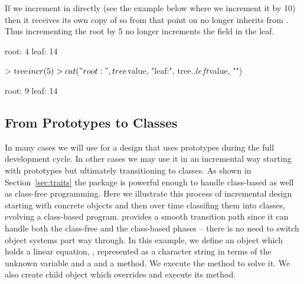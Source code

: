 \documentclass{Z}
\begin{document}
If we increment  in  directly (see the example
below where we increment it by 10) then it receives its own copy of
 so from that point on  no longer inherits
 from .  Thus incrementing the root by 5 no
longer increments the  field in the leaf.

\begin{Schunk}
\begin{Soutput}
root: 4 leaf: 14 
\end{Soutput}
\begin{Sinput}
> tree$incr(5)
> cat("root:", tree$value, "leaf:", tree$..left$value, "\n")
\end{Sinput}
\begin{Soutput}
root: 9 leaf: 14 
\end{Soutput}
\end{Schunk}

\subsection{From Prototypes to Classes}
\label{sec:increment}

In many cases we will use  for a design that uses prototypes
during the full development cycle.  In other cases we may use it in an
incremental way starting with prototypes but ultimately transitioning
to classes.
As shown in Section~\ref{sec:traits} the  package is
powerful enough to handle class-based as well as class-free programming.
Here we illustrate this process of incremental design 
starting with
concrete objects and then over time classifing them into classes,
evolving a class-based program.   provides a smooth
transition path since it can handle both the class-free and the class-based
phases -- there is no need to switch object systems part way through.
In this example, we define an object which holds a linear equation, ,
represented as a character string in terms of the unknown variable 
and a  and a  method.  We execute the 
 method 
to solve it.  We also create child object 
which overrides  and execute its  method.
\end{document}
